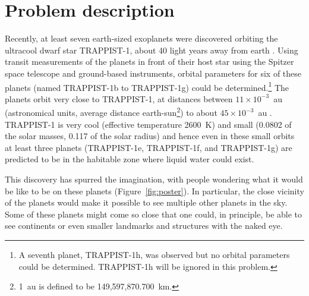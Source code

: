 \documentclass[letterpaper]{scrartcl}
\begin{document}
\section{Problem description}
\label{sec:problem}

Recently, at least seven earth-sized exoplanets were discovered
orbiting the ultracool dwarf star TRAPPIST-1, about 40 light years
away from earth \citep{Gillon:2016aa, Gillon:2017aa}. Using transit
measurements of the planets in front of their host star using the
Spitzer space telescope and ground-based instruments, orbital
parameters for six of these planets (named TRAPPIST-1b to TRAPPIST-1g)
could be determined.\footnote{A seventh planet, TRAPPIST-1h, was
  observed but no orbital parameters could be determined. TRAPPIST-1h
  will be ignored in this problem.} The planets orbit very close to
TRAPPIST-1, at distances between $11\times 10^{-3}$~au (astronomical
units, average distance earth-sun\footnote{1~au is defined to be
  149,597,870.700~km.}) to about $45\times 10^{-3}$~au
\citep{Gillon:2017aa}. TRAPPIST-1 is very cool (effective temperature
2600~K) and small (0.0802 of the solar masses, 0.117 of the solar
radius) and hence even in these small orbits at least three planets
(TRAPPIST-1e, TRAPPIST-1f, and TRAPPIST-1g) are predicted to be in the
habitable zone where liquid water could exist.

This discovery has spurred the imagination, with people wondering what
it would be like to be on these planets (Figure~\ref{fig:poster}). In
particular, the close vicinity of the planets would make it possible
to see multiple other planets in the sky. Some of these planets might
come so close that one could, in principle, be able to see continents
or even smaller landmarks and structures with the naked eye.
\end{document}
